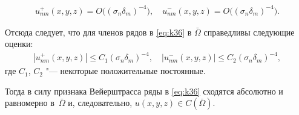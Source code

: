 \begin{gather*}
u_{nm}^{+}(x,y,z) =O\bigl((\sigma_n\delta_m)^{-4}\bigr),
\quad 
u_{nm}^{-}(x,y,z)=O\bigl((\sigma_n\delta_m)^{-4}\bigr).
\end{gather*}




	Отсюда следует, что для членов рядов в \eqref{eq:k36} в $\bar \Omega $ справедливы следующие оценки:
\begin{gather*}
|u_{nm}^{+}(x,y,z)|\le{C_1} (\sigma_n\delta_m)^{-4}, \quad 
|u_{nm}^{-}(x,y,z)|\le {C_2}(\sigma_n\delta_m)^{-4},
\end{gather*}
где $C_1$, $C_2$ "--- некоторые положительные постоянные.
	
Тогда в силу признака Вейерштрасса \cite[\S~430]{uk:bib:Fixtengols} ряды в \eqref{eq:k36} сходятся абсолютно и равномерно в~$\bar \Omega $ и, следовательно, $u(x,y,z)\in C(\bar\Omega).$

